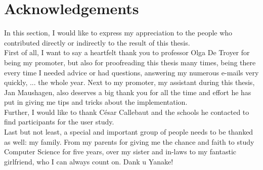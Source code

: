 \section*{Acknowledgements}\label{sec:acknowledgements}

In this section, I would like to express my appreciation to the people who contributed directly or indirectly to the result of this thesis.\\

First of all, I want to say a heartfelt thank you to professor Olga De Troyer for being my promoter, but also for proofreading this thesis many times, being there every time I needed advice or had questions, answering my numerous e-mails very quickly, ... the whole year. Next to my promoter, my assistant during this thesis, Jan Maushagen, also deserves a big thank you for all the time and effort he has put in giving me tips and tricks about the implementation.\\

Further, I would like to thank C\'esar Callebaut and the schools he contacted to find participants for the user study.\\

Last but not least, a special and important group of people needs to be thanked as well: my family. From my parents for giving me the chance and faith to study Computer Science for five years, over my sister and in-laws to my fantastic girlfriend, who I can always count on. Dank u Yanake!